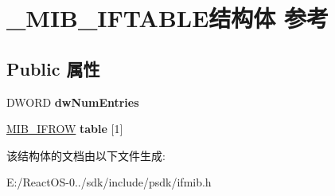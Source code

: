 \hypertarget{struct___m_i_b___i_f_t_a_b_l_e}{}\section{\+\_\+\+M\+I\+B\+\_\+\+I\+F\+T\+A\+B\+L\+E结构体 参考}
\label{struct___m_i_b___i_f_t_a_b_l_e}
\subsection*{Public 属性}
\begin{DoxyCompactItemize}
\item 
\mbox{\label{struct___m_i_b___i_f_t_a_b_l_e_a508d7ae45c4c16b4c863f8722716d5ea}} 
D\+W\+O\+RD {\bfseries dw\+Num\+Entries}
\item 
\mbox{\label{struct___m_i_b___i_f_t_a_b_l_e_a23a9235041d25e0990aeae644b419268}} 
\hyperlink{struct___m_i_b___i_f_r_o_w}{M\+I\+B\+\_\+\+I\+F\+R\+OW} {\bfseries table} \mbox{[}1\mbox{]}
\end{DoxyCompactItemize}


该结构体的文档由以下文件生成\+:\begin{DoxyCompactItemize}
\item 
E\+:/\+React\+O\+S-\/0../sdk/include/psdk/ifmib.\+h\end{DoxyCompactItemize}
